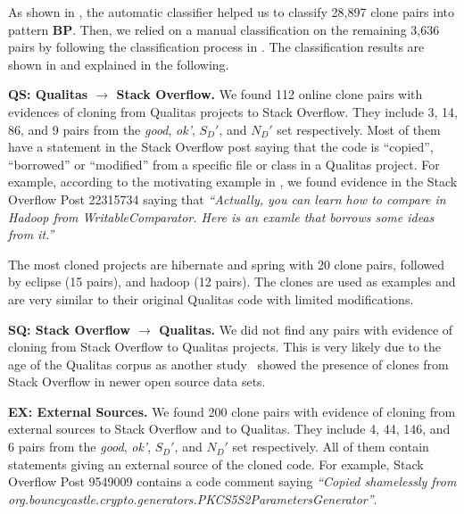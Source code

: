 \documentclass[sigconf,review, anonymous]{acmart}
\begin{document}
As shown in , the automatic
classifier helped us to classify 28,897 clone pairs into
pattern \textbf{BP}. Then, we relied on a manual classification
on the remaining 3,636 pairs by following the classification process
in . 
%
The classification results are shown in  
and explained in the following.

\textbf{QS: Qualitas $\rightarrow$ Stack Overflow.} We found 112
online clone pairs with evidences of cloning from Qualitas projects to
Stack Overflow. They include 3, 14, 86, and 9 pairs from the
\textit{good}, \textit{ok'}, $S_D'$, and $N_D'$ set respectively. Most of
them have a statement in the Stack Overflow post saying that the code
is ``copied'', ``borrowed'' or ``modified'' from a specific file or class in a
Qualitas project. For example, according to the motivating example in 
, we found evidence in the Stack Overflow 
Post 22315734 saying that \textit{``Actually, you can learn how to compare 
in Hadoop from WritableComparator. Here is an examle that borrows 
some ideas from it.''}

The most cloned projects are \textsf{hibernate} and
\textsf{spring} with 20 clone pairs, followed by \textsf{eclipse} (15
pairs), and \textsf{hadoop} (12 pairs). The clones are used as
examples and are very similar to their original Qualitas code with
limited modifications.

\textbf{SQ: Stack Overflow $\rightarrow$ Qualitas.} We did not find
any pairs with evidence of cloning from Stack Overflow to Qualitas
projects. This is very likely due to the age of the Qualitas corpus as
another study~\cite{An2017} showed the presence of clones from Stack
Overflow in newer open source data sets.

\textbf{EX: External Sources.} We found 200 clone pairs with
evidence of cloning from external sources to Stack Overflow and to Qualitas.  
They include 4, 44, 146, and 6 pairs from the \textit{good}, \textit{ok'},
$S_D'$, and $N_D'$ set respectively. All of them contain statements
giving an external source of the cloned code.  For example, Stack
Overflow Post 9549009 contains a code comment saying \textit{``Copied
  shamelessly from
  org.bouncycastle.crypto.generators.PKCS5S2ParametersGenerator''}.
\end{document}
